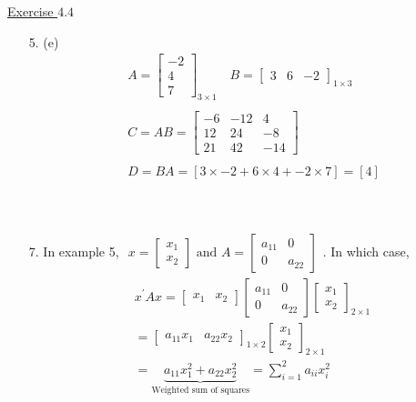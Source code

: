 \documentclass{./../../Latex/handout}
\begin{document}
\underline{Exercise $4.4$}

\begin{enumerate}
\item[5.] (e)  $$ \begin{aligned}
 & A=\left[\begin{array}{c}
-2 \\
4 \\
7
\end{array}\right]_{3 \times 1} \quad B=\left[\begin{array}{lll}
3 & 6 & -2
\end{array}\right]_{1 \times 3} \\~\\
& C=A B=\left[\begin{array}{ccc}
-6 & -12 & 4 \\
12 & 24 & -8 \\
21 & 42 & -14
\end{array}\right] \\~\\
& D=B A=[3 \times-2+6 \times 4+-2 \times 7]=[4]
\end{aligned} $$\\~\\

\item[7.] In example 5, $
\begin{aligned} x=\left[\begin{array}{l}x_{1} \\x_{2}\end{array}\right] \text{ and }A=\left[\begin{array}{cc}a_{11} & 0 \\0 & a_{22}\end{array}\right] \end{aligned} $.
In which case, 
$$
\begin{aligned}
& x^{\prime} A x=\left[\begin{array}{ll}x_{1} & x_{2}\end{array}\right]\left[\begin{array}{cc}a_{11} & 0 \\0 & a_{22}\end{array}\right]\left[\begin{array}{l}x_{1} \\x_{2}\end{array}\right]_{2 \times 1} \\
& =\left[\begin{array}{lll}a_{11} x_{1} & a_{22} x_{2}\end{array}\right]_{1 \times 2}\left[\begin{array}{l}x_{1} \\x_{2}\end{array}\right]_{2 \times 1} \\
& =\underbrace{a_{11} x_{1}^{2}+a_{22} x_{2}^{2}}_{\text{Weighted sum of squares}}=\sum_{i=1}^{2} a_{i i} x_{i}^{2}
\end{aligned}
$$


\end{enumerate}
\end{document}
